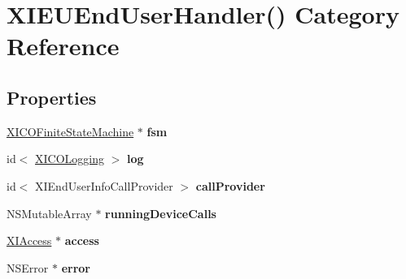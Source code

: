 \hypertarget{category_x_i_e_u_end_user_handler_07_08}{}\section{X\+I\+E\+U\+End\+User\+Handler() Category Reference}
\label{category_x_i_e_u_end_user_handler_07_08}
\subsection*{Properties}
\begin{DoxyCompactItemize}
\item 
\hypertarget{category_x_i_e_u_end_user_handler_07_08_a522a097f1172fda9b1629cb01dafbe69}{}\label{category_x_i_e_u_end_user_handler_07_08_a522a097f1172fda9b1629cb01dafbe69} 
\hyperlink{class_x_i_c_o_finite_state_machine}{X\+I\+C\+O\+Finite\+State\+Machine} $\ast$ {\bfseries fsm}
\item 
\hypertarget{category_x_i_e_u_end_user_handler_07_08_a3b72786d459e5bc8649f9619b87fbf12}{}\label{category_x_i_e_u_end_user_handler_07_08_a3b72786d459e5bc8649f9619b87fbf12} 
id$<$ \hyperlink{protocol_x_i_c_o_logging-p}{X\+I\+C\+O\+Logging} $>$ {\bfseries log}
\item 
\hypertarget{category_x_i_e_u_end_user_handler_07_08_a3bc5c572bbd09c20b1cb49d8471bf124}{}\label{category_x_i_e_u_end_user_handler_07_08_a3bc5c572bbd09c20b1cb49d8471bf124} 
id$<$ X\+I\+End\+User\+Info\+Call\+Provider $>$ {\bfseries call\+Provider}
\item 
\hypertarget{category_x_i_e_u_end_user_handler_07_08_acfbcfe44ab75c2014713941b92130f9e}{}\label{category_x_i_e_u_end_user_handler_07_08_acfbcfe44ab75c2014713941b92130f9e} 
N\+S\+Mutable\+Array $\ast$ {\bfseries running\+Device\+Calls}
\item 
\hypertarget{category_x_i_e_u_end_user_handler_07_08_aa5bc0cfff80fc1e4a2f12e9b3c2c5f19}{}\label{category_x_i_e_u_end_user_handler_07_08_aa5bc0cfff80fc1e4a2f12e9b3c2c5f19} 
\hyperlink{class_x_i_access}{X\+I\+Access} $\ast$ {\bfseries access}
\item 
\hypertarget{category_x_i_e_u_end_user_handler_07_08_a4a26913e30f8aa1b10c9d41eeda1aa0c}{}\label{category_x_i_e_u_end_user_handler_07_08_a4a26913e30f8aa1b10c9d41eeda1aa0c} 
N\+S\+Error $\ast$ {\bfseries error}
\item 
\hypertarget{category_x_i_e_u_end_user_handler_07_08_ae24fbe7cf8e367aec387128e5167068c}{}\label{category_x_i_e_u_end_user_handler_07_08_ae24fbe7cf8e367aec387128e5167068c} 

\end{DoxyCompactItemize}
